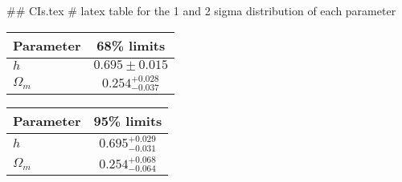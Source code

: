 ## CIs.tex
# latex table for the 1 and 2 sigma distribution of each parameter

\begin{tabular} { l  c}
 Parameter &  68\% limits\\
\hline
{\boldmath$h              $} & $0.695\pm 0.015            $\\
{\boldmath$\Omega_m       $} & $0.254^{+0.028}_{-0.037}   $\\
\hline
\end{tabular}

\begin{tabular} { l  c}
 Parameter &  95\% limits\\
\hline
{\boldmath$h              $} & $0.695^{+0.029}_{-0.031}   $\\
{\boldmath$\Omega_m       $} & $0.254^{+0.068}_{-0.064}   $\\
\hline
\end{tabular}

